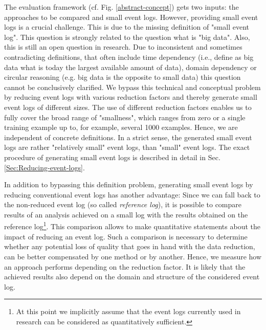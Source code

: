 \documentclass[runningheads]{llncs}
\begin{document}
The evaluation framework (cf. Fig. \ref{abstract-concept}) gets two inputs: the approaches to be compared and small event logs. However, providing small event logs is a crucial challenge. This is due to the missing definition of "small event log". This question is strongly related to the question what is "big data". Also, this is still an open question in research. Due to inconsistent and sometimes contradicting definitions, that often include time dependency (i.e., define as big data what is today the largest available amount of data), domain dependency or circular reasoning (e.g. big data is the opposite to small data) this question cannot be conclusively clarified. We bypass this technical and conceptual problem by reducing event logs with various reduction factors and thereby generate small event logs of different sizes. The use of different reduction factors enables us to fully cover the broad range of "smallness", which ranges from zero or a single training example up to, for example, several 1000 examples. Hence, we are independent of concrete definitions. In a strict sense, the generated small event logs are rather "relatively small" event logs, than "small" event logs. The exact procedure of generating small event logs is described in detail in Sec. \ref{Sec:Reducing-event-logs}. 

In addition to bypassing this definition problem, generating small event logs by reducing conventional event logs has another advantage:  Since we can fall back to the non-reduced event log (so called \textit{reference log}), it is possible to compare results of an analysis achieved on a small log with the results obtained on the reference log\footnote{At this point we implicitly assume that the event logs currently used in research can be considered as quantitatively sufficient.}. This comparison allows to make quantitative statements about the impact of reducing an event log. Such a comparison is necessary to determine whether any potential loss of quality that goes in hand with the data reduction, can be better compensated by one method or by another. Hence, we measure how an approach performs depending on the reduction factor. It is likely that the achieved results also depend on the domain and structure of the considered event log.
\end{document}
